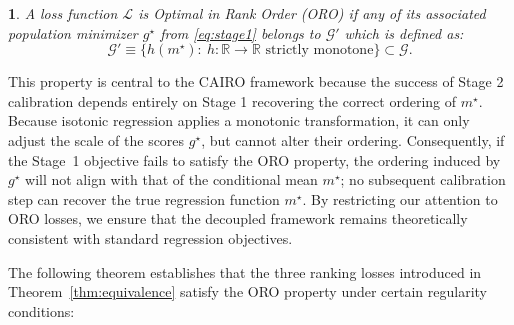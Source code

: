 \documentclass[11pt]{article}
\theoremstyle{plain}
\theoremstyle{plain}
\theoremstyle{plain}
\theoremstyle{plain}
\theoremstyle{plain}
\theoremstyle{plain}
\newtheorem{definition}{\protect\definitionname}
\theoremstyle{plain}
\providecommand{\definitionname}{Definition}
\begin{document}
\begin{definition}
\label{def:ORO}
  A loss function $\mathcal{L}$ is Optimal in Rank Order (ORO) if any of its associated population minimizer $g^{\star}$ from \eqref{eq:stage1} belongs to $\mathcal{G}'$ which is defined as:
  \[
    \mathcal{G}'\equiv\big\{h( m^{\star}):\ h:\mathbb{R}\to\mathbb{R}\text{ strictly monotone}\big\} \subset \mathcal{G}.
  \]
\end{definition}
This property is central to the CAIRO framework because the success of Stage 2 calibration depends entirely on Stage 1 recovering the correct ordering of $m^\star$. Because isotonic regression applies a monotonic transformation, it can only adjust the scale of the scores $g^\star$, but cannot alter their ordering. Consequently, if the Stage~1 objective fails to satisfy the ORO property, the ordering induced by $g^\star$ will not align with that of the conditional mean $m^\star$; no subsequent calibration step can recover the true regression function $m^\star$. By restricting our attention to ORO losses, we ensure that the decoupled framework remains theoretically consistent with standard regression objectives.

The following theorem establishes that the three ranking losses introduced in Theorem~\ref{thm:equivalence} satisfy the ORO property under certain regularity conditions: 
\end{document}
